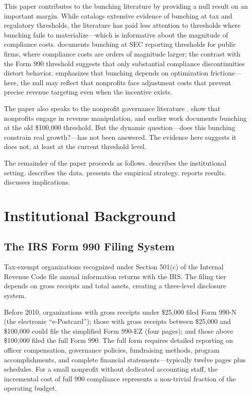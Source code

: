 \documentclass[12pt]{article}
\begin{document}
This paper contributes to the bunching literature by providing a null result on an important margin. While \citet{kleven2016bunching} catalogs extensive evidence of bunching at tax and regulatory thresholds, the literature has paid less attention to thresholds where bunching fails to materialize---which is informative about the magnitude of compliance costs. \citet{marx2021compliance} documents bunching at SEC reporting thresholds for public firms, where compliance costs are orders of magnitude larger; the contrast with the Form 990 threshold suggests that only substantial compliance discontinuities distort behavior. \citet{chetty2011adjustment} emphasizes that bunching depends on optimization frictions---here, the null may reflect that nonprofits face adjustment costs that prevent precise revenue targeting even when the incentive exists.

The paper also speaks to the nonprofit governance literature \citep{hansmann1980role, fama1983agency, yetman2013taxation}. \citet{krishnan2006effectiveness} show that nonprofits engage in revenue manipulation, and earlier work documents bunching at the old \$100,000 threshold. But the dynamic question---does this bunching constrain real growth?---has not been answered. The evidence here suggests it does not, at least at the current threshold level.

The remainder of the paper proceeds as follows.  describes the institutional setting.  describes the data.  presents the empirical strategy.  reports results.  discusses implications.


\section{Institutional Background}
\label{sec:background}

\subsection{The IRS Form 990 Filing System}

Tax-exempt organizations recognized under Section 501(c) of the Internal Revenue Code file annual information returns with the IRS. The filing tier depends on gross receipts and total assets, creating a three-level disclosure system.

Before 2010, organizations with gross receipts under \$25,000 filed Form 990-N (the electronic ``e-Postcard''); those with gross receipts between \$25,000 and \$100,000 could file the simplified Form 990-EZ (four pages); and those above \$100,000 filed the full Form 990. The full form requires detailed reporting on officer compensation, governance policies, fundraising methods, program accomplishments, and complete financial statements---typically twelve pages plus schedules. For a small nonprofit without dedicated accounting staff, the incremental cost of full 990 compliance represents a non-trivial fraction of the operating budget.
\end{document}
